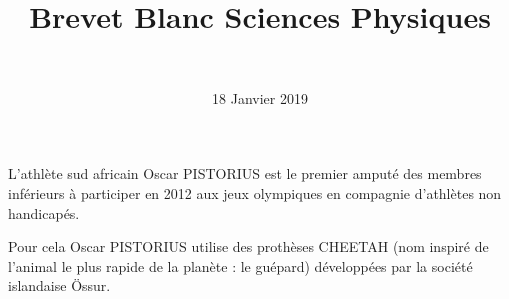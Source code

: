 \documentclass[a4paper,11pt]{exam}
\author{\ }
\date{18 Janvier 2019}
\title{Brevet Blanc Sciences Physiques}
\begin{document}
%	

	\maketitle
	
L'athlète sud africain Oscar PISTORIUS est le premier amputé des membres inférieurs à participer en 2012 aux jeux olympiques en compagnie d'athlètes non handicapés.

Pour cela Oscar PISTORIUS  utilise des prothèses CHEETAH (nom inspiré de l'animal le plus rapide de la planète : le guépard) développées par la société islandaise \"{O}ssur.
	

	




	







%
%
%

%






 
%
\ \label{LastPage}
\end{document}
